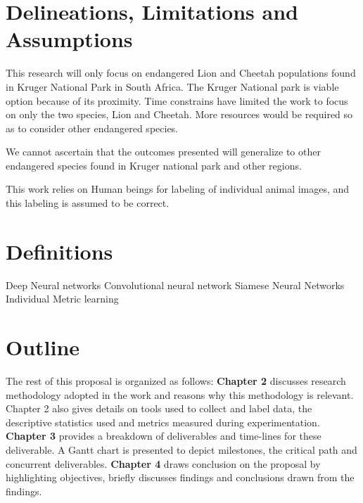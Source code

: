 \section{Delineations, Limitations and Assumptions}

This research will only focus on endangered Lion and Cheetah populations found in Kruger National Park in South Africa. The Kruger National park is viable option because of its proximity. Time constrains have limited the work to focus on only the two species, Lion and Cheetah. More resources would be required so as to consider other endangered species.

We cannot ascertain that the outcomes presented will generalize to other endangered species found in Kruger national park and other regions.

This work relies on Human beings for labeling of individual animal images, and this labeling is assumed to be correct.

\section{Definitions}
Deep Neural networks \newline
Convolutional neural network
Siamese Neural Networks \newline
Individual \newline
Metric learning \newline

\section{Outline}
The rest of this proposal is organized as follows: \textbf{Chapter 2} discusses research methodology adopted in the work and reasons why this methodology is relevant. Chapter 2 also gives details on tools used to collect and label data, the descriptive statistics used and metrics measured during experimentation. \textbf{Chapter 3} provides a breakdown of deliverables and time-lines for these deliverable. A Gantt chart is presented to depict milestones, the critical path and concurrent deliverables. \textbf{Chapter 4} draws conclusion on the proposal by highlighting objectives, briefly discusses findings and conclusions drawn from the findings.  
